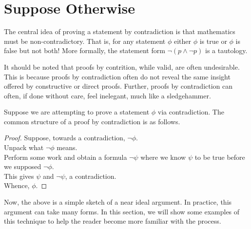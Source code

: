 \section{Suppose Otherwise}



The central idea of proving a statement by contradiction is that mathematics must be non-contradictory.
That is, for any statement $\phi$ either $\phi$ is true or $\phi$ is false but not both!
More formally, the statement form $\neg(p\wedge\neg p)$ is a tautology.

It should be noted that proofs by contrition, while valid, are often undesirable.
This is because proofs by contradiction often do not reveal the same insight offered by constructive or direct proofs.
Further, proofs by contradiction can often, if done without care, feel inelegant, much like a sledgehammer.

Suppose we are attempting to prove a statement $\phi$ via contradiction.
The common structure of a proof by contradiction is as follows.
\begin{proof}
  Suppose, towards a contradiction, $\neg\phi$.\\
  Unpack what $\neg\phi$ means.\\
  Perform some work and obtain a formula $\neg\psi$ where we know $\psi$ to be true before we supposed $\neg\phi$.\\
  This gives $\psi$ and $\neg\psi$, a contradiction.\\
  Whence, $\phi$.
\end{proof}
Now, the above is a simple sketch of a near ideal argument.
In practice, this argument can take many forms.
In this section, we will show some examples of this technique to help the reader become more familiar with the process.




